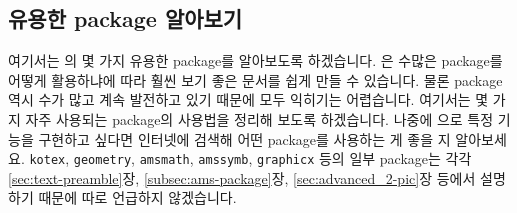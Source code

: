 \subsection{유용한 package 알아보기}
\label{sec:advanced-package}
여기서는 \lt 의 몇 가지 유용한 package를 알아보도록 하겠습니다.
\lt 은 수많은 package를 어떻게 활용하냐에 따라 훨씬 보기 좋은 문서를 쉽게 만들 수 있습니다.
물론 package 역시 수가 많고 계속 발전하고 있기 때문에 모두 익히기는 어렵습니다.
여기서는 몇 가지 자주 사용되는 package의 사용법을 정리해 보도록 하겠습니다.
나중에 \lt 으로 특정 기능을 구현하고 싶다면 인터넷에 검색해 어떤 package를 사용하는 게 좋을 지 알아보세요. \verb|kotex|, \verb|geometry|, \verb|amsmath|, \verb|amssymb|, \verb|graphicx| 등의 일부 package는 각각 \ref{sec:text-preamble}장, \ref{subsec:ams-package}장, \ref{sec:advanced_2-pic}장 등에서 설명하기 때문에 따로 언급하지 않겠습니다.
